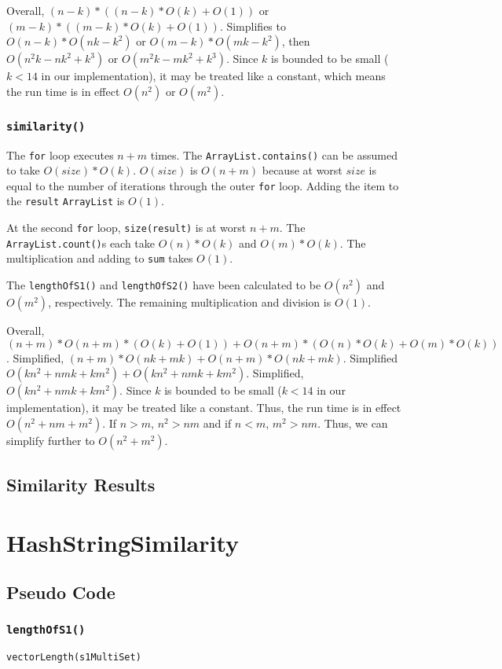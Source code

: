 \documentclass[10pt,letterpaper]{article}
\begin{document}
Overall, $(n-k)*((n-k)*O(k)+O(1))$ or $(m-k)*((m-k)*O(k)+O(1))$. Simplifies to
$O(n-k)*O(nk-k^2)$ or $O(m-k)*O(mk-k^2)$, then $O(n^2k-nk^2+k^3)$ or
$O(m^2k-mk^2+k^3)$.  Since $k$ is bounded to be small ($k<14$ in our
implementation), it may be treated like a constant, which means the run time is
in effect $O(n^2)$ or $O(m^2)$.
\subsubsection{\texttt{similarity()}}
The \texttt{for} loop executes $n+m$ times. The \texttt{ArrayList.contains()}
can be assumed to take $O(size)*O(k)$. $O(size)$ is $O(n+m)$ because at worst
$size$ is equal to the number of iterations through the outer \texttt{for} loop.
Adding the item to the \texttt{result} \texttt{ArrayList} is $O(1)$.

At the second \texttt{for} loop, \texttt{size(result)} is at worst $n+m$.
The \texttt{ArrayList.count()}s each take $O(n)*O(k)$ and $O(m)*O(k)$. The
multiplication and adding to \texttt{sum} takes $O(1)$.

The \texttt{lengthOfS1()} and \texttt{lengthOfS2()} have been calculated to be
$O(n^2)$ and $O(m^2)$, respectively. The remaining multiplication and division
is $O(1)$.

Overall, $(n+m)*O(n+m)*(O(k)+O(1))+O(n+m)*(O(n)*O(k)+O(m)*O(k))$. Simplified,
$(n+m)*O(nk+mk)+O(n+m)*O(nk+mk)$. Simplified $O(kn^2+nmk+km^2)+O(kn^2+nmk+km^2)$.
Simplified, $O(kn^2+nmk+km^2)$. Since $k$ is bounded to be small ($k<14$ in
our implementation), it may be treated like a constant. Thus, the run time is
in effect $O(n^2+nm+m^2)$. If $n>m$, $n^2>nm$ and if $n<m$, $m^2>nm$. Thus, we
can simplify further to $O(n^2+m^2)$.
\subsection{Similarity Results}
\section{HashStringSimilarity}
\subsection{Pseudo Code}
\subsubsection{\texttt{lengthOfS1()}} 
\begin{verbatim}
vectorLength(s1MultiSet)
\end{verbatim}
\end{document}

